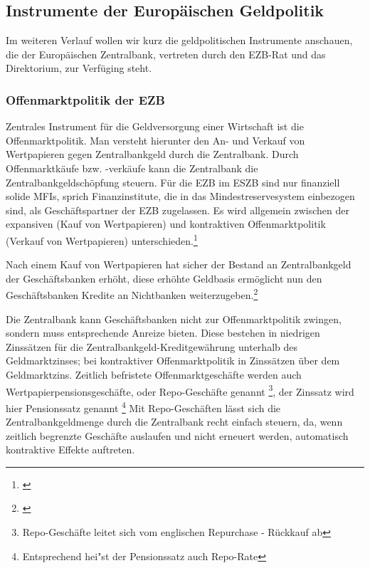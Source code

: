 \documentclass[
        onecolumn,
        a4paper,
        abstracton,
        parskip=half
        ,final
        ]{scrartcl}
\begin{document}
\subsection{Instrumente der Europ{\"a}ischen Geldpolitik}

	Im weiteren Verlauf wollen wir kurz die geldpolitischen Instrumente anschauen, die der Europ{\"a}ischen Zentralbank, vertreten durch den EZB-Rat und das Direktorium, zur Verf{\"u}ging steht.

\subsubsection{Offenmarktpolitik der EZB}



Zentrales Instrument f{\"u}r die Geldversorgung einer Wirtschaft ist die Offenmarktpolitik. Man versteht hierunter den An- und Verkauf von Wertpapieren gegen Zentralbankgeld durch die Zentralbank.
Durch Offenmarktk{\"a}ufe bzw. -verk{\"a}ufe kann die Zentralbank die Zentralbankgeldsch{\"o}pfung steuern. F{\"u}r die EZB im ESZB sind nur finanziell solide MFIs, sprich Finanzinstitute, die in das Mindestreservesystem einbezogen sind, als Gesch{\"a}ftspartner der EZB zugelassen. Es wird allgemein zwischen der expansiven (Kauf von Wertpapieren) und kontraktiven Offenmarktpolitik (Verkauf von Wertpapieren) unterschieden.\footnote[54]{\citep[S.556]{Basseler2010}}

Nach einem Kauf von Wertpapieren hat sicher der Bestand an Zentralbankgeld der Gesch{\"a}ftsbanken erh{\"o}ht, diese erh{\"o}hte Geldbasis erm{\"o}glicht nun den Gesch{\"a}ftsbanken Kredite an Nichtbanken weiterzugeben.\footnote[55]{\citep[S.557]{Basseler2010}}

Die Zentralbank kann Gesch{\"a}ftsbanken nicht zur Offenmarktpolitik zwingen, sondern muss entsprechende Anreize bieten. Diese bestehen in niedrigen Zinss{\"a}tzen f{\"u}r die Zentralbankgeld-Kreditgew{\"a}hrung unterhalb des Geldmarktzinses; bei kontraktiver Offenmarktpolitik in Zinss{\"a}tzen {\"u}ber dem Geldmarktzins.
Zeitlich befristete Offenmarktgesch{\"a}fte werden auch Wertpapierpensionsgesch{\"a}fte, oder Repo-Gesch{\"a}fte genannt \footnote[36]{Repo-Gesch{\"a}fte leitet sich vom englischen Repurchase - R{\"u}ckkauf ab}, der Zinssatz wird hier Pensionssatz genannt \footnote[37]{Entsprechend hei{"s}t der Pensionssatz auch Repo-Rate}
Mit Repo-Gesch{\"a}ften l{\"a}sst sich die Zentralbankgeldmenge durch die Zentralbank recht einfach steuern, da, wenn zeitlich begrenzte Gesch{\"a}fte auslaufen und nicht erneuert werden, automatisch kontraktive Effekte auftreten.
\end{document}
